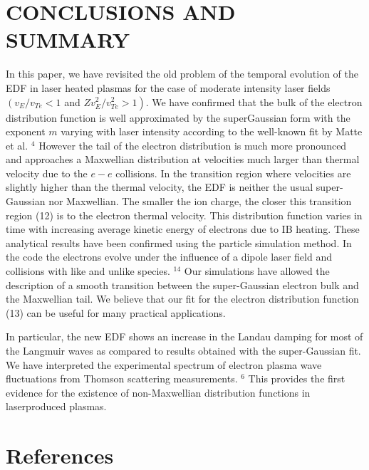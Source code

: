 \documentclass[oneside,onecolumn]{article}
\begin{document}
\begin{sloppypar}
 \section{CONCLUSIONS AND SUMMARY}
 In this paper, we have revisited the old problem of the temporal evolution of the EDF in laser heated plasmas for the case of moderate intensity laser fields $\left(v_{E} / v_{T e}<1\right.$ and $\left.Z v_{E}^{2} / v_{T e}^{2}>1\right)$. We have confirmed that the bulk of the electron distribution function is well approximated by the superGaussian form with the exponent $m$ varying with laser intensity according to the well-known fit by Matte et al. ${ }^{4}$ However the tail of the electron distribution is much more pronounced and approaches a Maxwellian distribution at velocities much larger than thermal velocity due to the $e-e$ collisions. In the transition region where velocities are slightly higher than the thermal velocity, the EDF is neither the usual super-Gaussian nor Maxwellian. The smaller the ion charge, the closer this transition region (12) is to the electron thermal velocity. This distribution function varies in time with increasing average kinetic energy of electrons due to IB heating. These analytical results have been confirmed using the particle simulation method. In the code the electrons evolve under the influence of a dipole laser field and collisions with like and unlike species. ${ }^{14}$ Our simulations have allowed the description of a smooth transition between the super-Gaussian electron bulk and the Maxwellian tail. We believe that our fit for the electron distribution function (13) can be useful for many practical applications.
 
 In particular, the new EDF shows an increase in the Landau damping for most of the Langmuir waves as compared to results obtained with the super-Gaussian fit. We have interpreted the experimental spectrum of electron plasma wave fluctuations from Thomson scattering measurements. $^{6}$ This provides the first evidence for the existence of non-Maxwellian distribution functions in laserproduced plasmas.
 \clearpage
 \section*{References}
 \end{sloppypar}	
 
\end{document}
